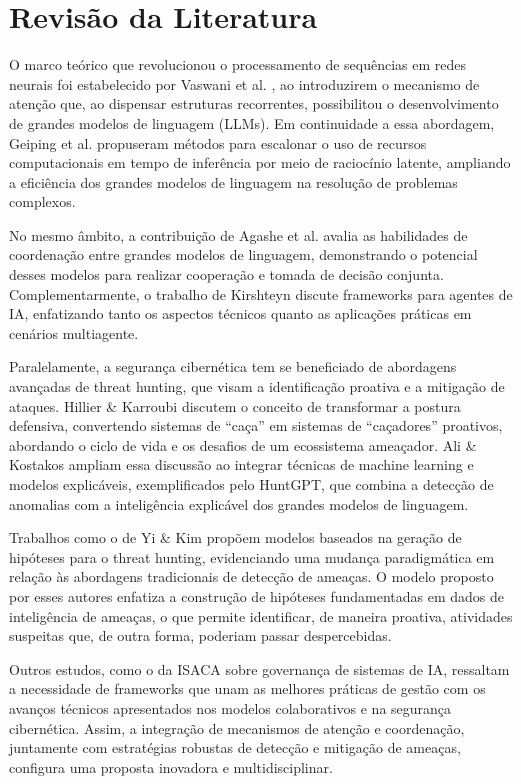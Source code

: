 \documentclass[article,12pt,a4paper]{abntex2}
\begin{document}
\section{Revisão da Literatura}
O marco teórico que revolucionou o processamento de sequências em redes neurais foi estabelecido por Vaswani et al. \cite{vaswani2017attention}, ao introduzirem o mecanismo de atenção que, ao dispensar estruturas recorrentes, possibilitou o desenvolvimento de grandes modelos de linguagem (LLMs). Em continuidade a essa abordagem, Geiping et al. \cite{arxiv250205171} propuseram métodos para escalonar o uso de recursos computacionais em tempo de inferência por meio de raciocínio latente, ampliando a eficiência dos grandes modelos de linguagem na resolução de problemas complexos.

No mesmo âmbito, a contribuição de Agashe et al. \cite{agashe2023llmcoordination} avalia as habilidades de coordenação entre grandes modelos de linguagem, demonstrando o potencial desses modelos para realizar cooperação e tomada de decisão conjunta. Complementarmente, o trabalho de Kirshteyn \cite{kirshteyn2024aif} discute frameworks para agentes de IA, enfatizando tanto os aspectos técnicos quanto as aplicações práticas em cenários multiagente.

Paralelamente, a segurança cibernética tem se beneficiado de abordagens avançadas de threat hunting, que visam a identificação proativa e a mitigação de ataques. Hillier \& Karroubi \cite{hillier2022turninghuntedhunterthreat} discutem o conceito de transformar a postura defensiva, convertendo sistemas de “caça” em sistemas de “caçadores” proativos, abordando o ciclo de vida e os desafios de um ecossistema ameaçador. Ali \& Kostakos \cite{ali2023huntgptintegratingmachinelearningbased} ampliam essa discussão ao integrar técnicas de machine learning e modelos explicáveis, exemplificados pelo HuntGPT, que combina a detecção de anomalias com a inteligência explicável dos grandes modelos de linguagem.

Trabalhos como o de Yi \& Kim \cite{10713082} propõem modelos baseados na geração de hipóteses para o threat hunting, evidenciando uma mudança paradigmática em relação às abordagens tradicionais de detecção de ameaças. O modelo proposto por esses autores enfatiza a construção de hipóteses fundamentadas em dados de inteligência de ameaças, o que permite identificar, de maneira proativa, atividades suspeitas que, de outra forma, poderiam passar despercebidas.

Outros estudos, como o da ISACA \cite{isaca2025leveraging} sobre governança de sistemas de IA, ressaltam a necessidade de frameworks que unam as melhores práticas de gestão com os avanços técnicos apresentados nos modelos colaborativos e na segurança cibernética. Assim, a integração de mecanismos de atenção e coordenação, juntamente com estratégias robustas de detecção e mitigação de ameaças, configura uma proposta inovadora e multidisciplinar.
\end{document}
